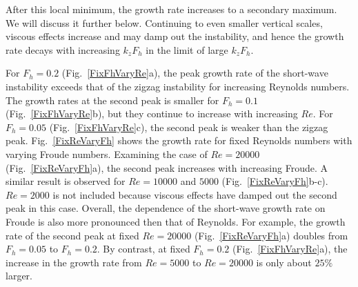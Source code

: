 After this local minimum, the growth rate increases to a secondary maximum. We will discuss it further below. Continuing to even smaller vertical scales, viscous effects increase and may damp out the instability, and hence the growth rate decays with increasing $k_{z}F_{h}$ in the limit of large $k_{z}F_{h}$. 

For $F_{h}=0.2$ (Fig.~\ref{FixFhVaryRe}a), the peak growth rate of the short-wave instability exceeds that of the zigzag instability for increasing Reynolds numbers. The growth rates at the second peak is smaller for $F_{h}=0.1$ (Fig.~\ref{FixFhVaryRe}b), but they continue to increase with increasing $Re$. For $F_{h}=0.05$ (Fig.~\ref{FixFhVaryRe}c), the second peak is weaker than the zigzag peak. Fig.~\ref{FixReVaryFh} shows the growth rate for fixed Reynolds numbers with varying Froude numbers. Examining the case of $Re=20000$ (Fig.~\ref{FixReVaryFh}a), the second peak increases with increasing Froude. A similar result is observed for $Re=10000$ and $5000$ (Fig.~\ref{FixReVaryFh}b-c). $Re=2000$ is not included because viscous effects have damped out the second peak in this case. Overall, the dependence of the short-wave growth rate on Froude is also more pronounced then that of Reynolds. For example, the growth rate of the second peak at fixed $Re=20000$ (Fig.~\ref{FixReVaryFh}a) doubles from $F_{h}=0.05$ to $F_{h}=0.2$. By contrast, at fixed $F_{h}=0.2$ (Fig.~\ref{FixFhVaryRe}a), the increase in the growth rate from $Re=5000$ to $Re=20000$ is only about $25\%$ larger. 

